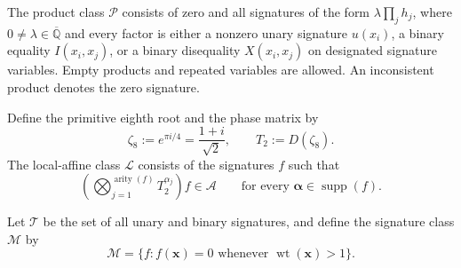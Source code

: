 \documentclass[11pt,letterpaper,onecolumn]{article}
\theoremstyle{plain}
\theoremstyle{definition}
\theoremstyle{remark}
\newcommand{\AlgNums}{\overline{\mathbb Q}}
\newcommand{\cA}{\mathscr A}
\newcommand{\cP}{\mathscr P}
\newcommand{\cL}{\mathscr L}
\newcommand{\cM}{\mathscr M}
\newcommand{\cT}{\mathscr T}
\newcommand{\wt}{\operatorname{wt}}
\newcommand{\supp}{\operatorname{supp}}
\newcommand{\arity}{\operatorname{arity}}
\begin{document}
The product class \(\cP\) consists of zero and all signatures of the form
\(\lambda\prod_jh_j\), where \(0\ne\lambda\in\AlgNums\) and every factor is
either a nonzero unary signature \(u(x_i)\), a binary equality
\(I(x_i,x_j)\), or a binary disequality \(X(x_i,x_j)\) on designated
signature variables.  Empty products and repeated variables are allowed.
An inconsistent product denotes the zero signature.

Define the primitive eighth root and the phase matrix by
\[
 \zeta_8:=e^{\pi i/4}=\frac{1+i}{\sqrt2},
 \qquad T_2:=D(\zeta_8).
\]
The local-affine class \(\cL\) consists of the signatures \(f\) such that
\begin{equation*}
 \left(\bigotimes_{j=1}^{\arity(f)}T_2^{\alpha_j}\right)f\in\cA
 \qquad\text{for every }{\boldsymbol{\alpha}}\in\supp(f).
\end{equation*}

Let \(\cT\) be the set of all unary and binary signatures, and define the
signature class \(\cM\) by
\begin{equation*}
  \cM=\{f:f({\mathbf{x}})=0\text{ whenever }\wt({\mathbf{x}})>1\}.
\end{equation*}
\end{document}
